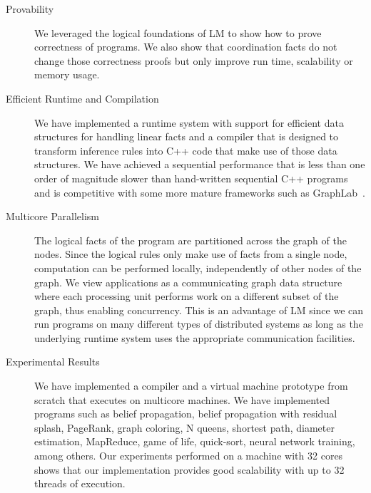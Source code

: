 \begin{description}
   \item[Provability]
   
   We leveraged the logical foundations of LM to show how to prove correctness
   of programs. We also show that coordination facts do not change those
   correctness proofs but only improve run time, scalability or memory usage.

\item[Efficient Runtime and Compilation]

   We have implemented a runtime system with support for efficient data
   structures for handling linear facts and a compiler that is designed to
   transform inference rules into C++ code that make use of those data
   structures. We have achieved a sequential performance that is less than one
   order of magnitude slower than hand-written sequential C++ programs and is
   competitive with some more mature frameworks such as
   GraphLab~\cite{GraphLab2010}.

\item[Multicore Parallelism]
   
   The logical facts of the program are partitioned across the graph of the
   nodes. Since the logical rules only make use of facts from a single node,
   computation can be performed locally, independently of other nodes of the
   graph. We view applications as a communicating graph data structure where
   each processing unit performs work on a different subset of the graph, thus
   enabling concurrency. This is an advantage of LM since we can run programs on
   many different types of distributed systems as long as the underlying runtime
   system uses the appropriate communication facilities.

\item[Experimental Results]

   We have implemented a compiler and a virtual machine prototype from scratch
   that executes on multicore machines.  We have implemented programs such as
   belief propagation, belief propagation with residual splash, PageRank, graph
   coloring, N queens, shortest path, diameter estimation, MapReduce, game of
   life, quick-sort, neural network training, among others. Our experiments
   performed on a machine with 32 cores shows that our implementation provides
   good scalability with up to 32 threads of execution.
   
\end{description}
